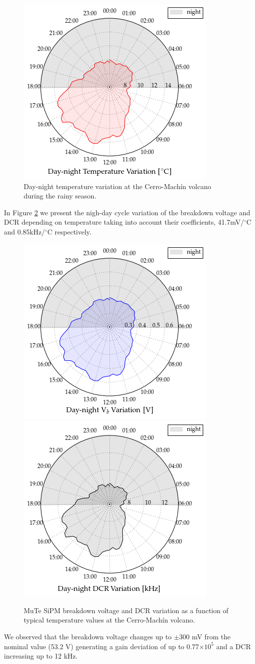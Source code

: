 \documentclass[a4paper,11pt]{article}
\begin{document}
\begin{figure}[htbp]
\centering 
\includegraphics[width=.4\textwidth]{Figures/Temp.png}
\caption{\label{fig:temp_mach} Day-night temperature variation at the Cerro-Mach\'in volcano during the rainy season.}
\end{figure}

In Figure \ref{fig:behav} we present the nigh-day cycle variation of the breakdown voltage and DCR depending on temperature taking into account their coefficients, 41.7mV/$^{\circ}$C and 0.85kHz/$^{\circ}$C respectively.

\begin{figure}[htbp]
\centering 
\includegraphics[width=.4\textwidth]{Figures/Vb.png}
\includegraphics[width=.4\textwidth]{Figures/DCR.png}
\caption{\label{fig:behav} MuTe SiPM breakdown voltage and DCR variation as a function of typical temperature values at the Cerro-Mach\'in volcano.}
\end{figure}

We observed that the breakdown voltage changes up to $\pm$300 mV from the nominal value (53.2 V) generating a gain deviation of up to 0.77$\times 10^5$ and a DCR increasing up to 12 kHz. 
\end{document}
